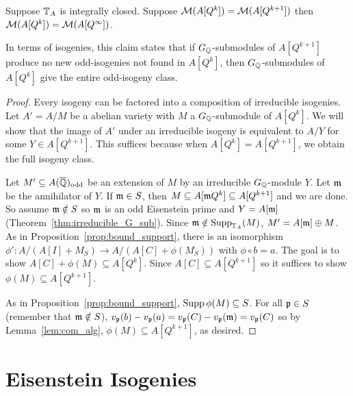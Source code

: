\begin{proposition}%
    \label{prop:stop_looking}
    Suppose $\mathbb{T}_A$ is integrally closed. Suppose $\mathcal{M}(A[Q^k])=\mathcal{M}(A[Q^{k+1}])$
    then $\mathcal{M}(A[Q^k])=\mathcal{M}(A[Q^\infty])$.

    In terms of isogenies, this claim states that if $G_{\mathbb{Q}}$-submodules of
    $A[Q^{k+1}]$ produce no new odd-isogenies not found in $A[Q^k]$, then
    $G_{\mathbb{Q}}$-submodules of $A[Q^k]$ give the entire odd-isogeny class.
\end{proposition}
\begin{proof}
    Every isogeny can be factored into a composition of irreducible isogenies.
    Let $A'=A/M$ be a abelian variety with $M$ a $G_{\mathbb{Q}}$-submodule of $A[Q^k]$. We
    will show that the image of $A'$ under an irreducible isogeny is equivalent
    to $A/Y$ for some $Y\in A[Q^{k+1}]$. This suffices because when
    $A[Q^k]=A[Q^{k+1}]$, we obtain the full isogeny class.

    Let $M'\subseteq A(\overline{\mathbb{Q}})_{\mathrm{odd}}$ be an extension of $M$ by an irreducible
    $G_{\mathbb{Q}}$-module $Y$. Let $\mathfrak{m}$ be the annihilator of $Y$. If $\mathfrak{m}\in S$, then
    $M\subseteq A[\mathfrak{m} Q^k]\subseteq A[Q^{k+1}]$ and we are done. So assume
    $\mathfrak{m}\notin S$ so $\mathfrak{m}$ is an odd Eisenstein prime and $Y=A[\mathfrak{m}]$
    (Theorem~\ref{thm:irreducible_G_sub}). Since $\mathfrak{m}\notin \operatorname{Supp}_{\mathbb{T}_A}(M)$,
    $M' = A[\mathfrak{m}]\oplus M$. As in Proposition~\ref{prop:bound_support}, there is
    an isomorphism $\phi':A/(A[I]+M_S)\to A/(A[C]+\phi(M_S))$ with $\phi\circ b
    = a$. The goal is to show $A[C]+\phi(M)\subseteq A[Q^k]$. Since
    $A[C]\subseteq A[Q^{k+1}]$ so it suffices to show $\phi(M)\subseteq
    A[Q^{k+1}]$.

    As in Proposition~\ref{prop:bound_support}, $\operatorname{Supp}\phi(M)\subseteq S$. For all
    $\mathfrak{p}\in S$ (remember that $\mathfrak{m} \notin S$), $v_{\mathfrak{p}}(b)-v_{\mathfrak{p}}(a) =
    v_{\mathfrak{p}}(C)-v_{\mathfrak{p}}(\mathfrak{m})=v_{\mathfrak{p}}(C)$ so by Lemma~\ref{lem:com_alg},
    $\phi(M)\subseteq A[Q^{k+1}]$, as desired.
\end{proof}

\section{Eisenstein Isogenies}%
\label{sec:eisenstein_isogenies}

